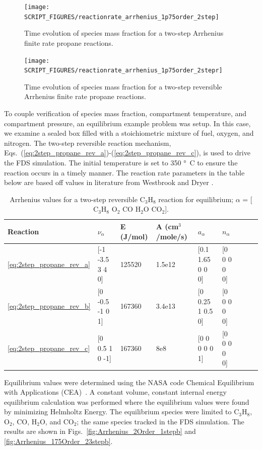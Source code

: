 \documentclass[11pt]{book}
\begin{document}
\begin{figure}[h!]
\centering
\texttt{[image: SCRIPT\_FIGURES/reactionrate\_arrhenius\_1p75order\_2step]}
\caption[Species evolution in a 1.75-order 2-step finite rate reaction]{Time evolution of species mass fraction for a two-step Arrhenius finite rate propane reactions.}
\label{fig:Arrhenius_175Order_2step}
\end{figure}

\begin{figure}[h!]
\centering
\texttt{[image: SCRIPT\_FIGURES/reactionrate\_arrhenius\_1p75order\_2stepr]}
\caption[Species evolution in a 1.75-order 2-step reversible finite rate reaction]{Time evolution of species mass fraction for a two-step reversible Arrhenius finite rate propane reactions.}
\label{fig:Arrhenius_175Order_2stepR}
\end{figure}

To couple verification of species mass fraction, compartment temperature, and compartment pressure, an equilibrium example problem was setup. In this case, we examine a sealed box filled with a stoichiometric mixture of fuel, oxygen, and nitrogen. The two-step reversible reaction mechanism, Eqs.~(\ref{eq:2step_propane_rev_a})-(\ref{eq:2step_propane_rev_c}), is used to drive the FDS simulation. The initial temperature is set to 350 \si{\degree C} to ensure the reaction occurs in a timely manner. The reaction rate parameters in the table below are based off values in literature from Westbrook and Dryer \cite{Westbrook:1}.
\begin{table}[ht]
\begin{center}
\caption[Arrhenius values for a two-step reversible C$_3$H$_8$ reaction]{Arrhenius values for a two-step reversible C$_3$H$_8$ reaction for equilibrium; $\alpha$ = [$\mathrm{C_3H_8}$ $\mathrm{O_2}$ $\mathrm{CO}$ $\mathrm{H_2O}$ $\mathrm{CO_2}$].}
\label{two_step_eq_rev_c3h8}
\begin{tabular}{|l|l|l|l|l|l|l|l|l|}
\hline Reaction & $\nu_{\alpha}$ & E (J/mol) & A (cm$^3$/mole/s) & $a_{\alpha}$ & $n_{\alpha}$  \\ \hline \hline
\ref{eq:2step_propane_rev_a} & [-1 -3.5 3 4 0] & 125520 & 1.5e12 & [0.1 1.65 0 0 0] & [0 0 0 0 0] \\ \hline
\ref{eq:2step_propane_rev_b} & [0 -0.5 -1 0 1] & 167360 & 3.4e13 & [0 0.25 1 0.5 0] & [0 0 0 0 0] \\ \hline
\ref{eq:2step_propane_rev_c} & [0 0.5 1 0 -1]  & 167360 & 8e8    & [0 0 0 0 0 1]    & [0 0 0 0 0] \\ \hline
\end{tabular}
\end{center}
\end{table}
Equilibrium values were determined using the NASA code Chemical Equilibrium with Applications (CEA)~\cite{Gordon:1994}. A constant volume, constant internal energy equilibrium calculation was performed where the equilibrium values were found by minimizing Helmholtz Energy. The equilibrium species were limited to $\mathrm{C_3H_8}$, $\mathrm{O_2}$, $\mathrm{CO}$, $\mathrm{H_2O}$, and $\mathrm{CO_2}$; the same species tracked in the FDS simulation.  The results are shown in Figs.~\ref{fig:Arrhenius_2Order_1stepb} and \ref{fig:Arrhenius_175Order_23stepb}.
\end{document}
